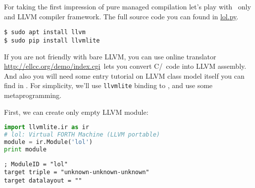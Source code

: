 \clearpage{}\label{llvmpy}\secdown

For taking the first impression of pure managed compilation let's play with
\py\ only and LLVM compiler framework. The full source code you can found in
\href{https://github.com/ponyatov/o/blob/master/lol.py}{lol.py}.

\begin{lstlisting}
$ sudo apt install llvm
$ sudo pip install llvmlite
\end{lstlisting}

\noindent
If you are not friendly with bare LLVM, you can use online translator 
\url{http://ellcc.org/demo/index.cgi}\ lets you convert C/\cpp\ code into
LLVM assembly. And also you will need some entry tutorial on LLVM class model
itself you can find in \cite{llvmcore}. For simplicity, we'll use
\verb|llvmlite| binding to \py, and use some metaprogramming.

\pg
First, we can create only empty LLVM module:
\begin{lstlisting}[language=Python]
import llvmlite.ir as ir
# lol: Virtual FORTH Machine (LLVM portable)
module = ir.Module('lol')
print module
\end{lstlisting}
\begin{lstlisting}
; ModuleID = "lol"
target triple = "unknown-unknown-unknown"
target datalayout = ""
\end{lstlisting}

\secup